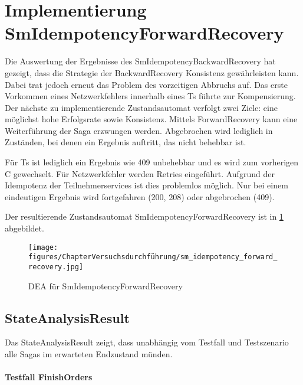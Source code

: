 \section{Implementierung SmIdempotencyForwardRecovery}
Die Auswertung der Ergebnisse des SmIdempotencyBackwardRecovery hat gezeigt, dass die Strategie der BackwardRecovery Konsistenz gewährleisten kann. Dabei trat jedoch erneut das Problem des vorzeitigen Abbruchs auf. Das erste Vorkommen eines Netzwerkfehlers innerhalb eines Ts führte zur Kompensierung. Der nächste zu implementierende Zustandsautomat verfolgt zwei Ziele: eine möglichst hohe Erfolgsrate sowie Konsistenz. Mittels ForwardRecovery kann eine Weiterführung der Saga erzwungen werden. Abgebrochen wird lediglich in Zuständen, bei denen ein Ergebnis auftritt, das nicht behebbar ist. 

Für Ts ist lediglich ein Ergebnis wie 409 unbehebbar und es wird zum vorherigen C gewechselt. Für Netzwerkfehler werden Retries eingeführt. Aufgrund der Idempotenz der Teilnehmerservices ist dies problemlos möglich. Nur bei einem eindeutigen Ergebnis wird fortgefahren (200, 208) oder abgebrochen (409). 

Der resultierende Zustandsautomat SmIdempotencyForwardRecovery ist in \cref{fig:SmIdempotencyForwardRecovery} abgebildet.


\begin{figure}[h!]
	\centering
	\texttt{[image: figures/ChapterVersuchsdurchführung/sm\_idempotency\_forward\_recovery.jpg]}
	\caption{DEA für SmIdempotencyForwardRecovery}
	\label{fig:SmIdempotencyForwardRecovery}
\end{figure}
\FloatBarrier

\subsection{StateAnalysisResult}

Das StateAnalysisResult zeigt, dass unabhängig vom Testfall und Testszenario alle Sagas im erwarteten Endzustand münden. 

\paragraph*{Testfall FinishOrders}


